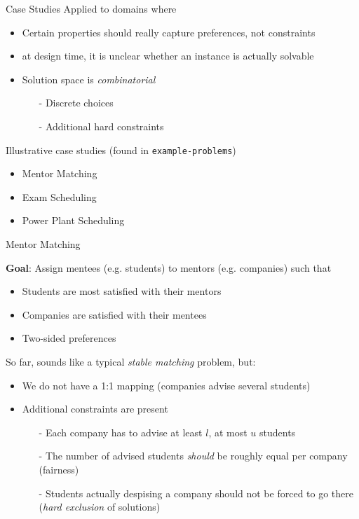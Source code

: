 \documentclass[handout,10pt,xcolor={dvipsnames},fleqn]{beamer}
\begin{document}
\begin{frame}{Case Studies}
Applied to domains where 
\begin{itemize}
\item Certain properties should really capture \alert{preferences}, not constraints
\item at design time, it is \alert{unclear} whether an instance is actually solvable
\item Solution space is \emph{combinatorial}
\begin{itemize}
\item[-] Discrete choices
\item[-] Additional hard constraints
\end{itemize}
\end{itemize}

\vspace*{2ex}

Illustrative case studies (found in \texttt{example-problems})
\begin{itemize}
\item Mentor Matching
\item Exam Scheduling
\item Power Plant Scheduling
\end{itemize}
\end{frame}


\begin{frame}[fragile]{Mentor Matching}

\textbf{Goal}: Assign mentees (e.g. students) to mentors (e.g. companies) such that 
\begin{itemize}
\item Students are most satisfied with their mentors 
\item Companies are satisfied with their mentees
\item Two-sided preferences
\end{itemize}

\vspace*{2ex}

So far, sounds like a typical \emph{stable matching} problem, but:

\begin{itemize}
\item We do not have a 1:1 mapping (companies advise several students)
\item Additional constraints are present
\begin{itemize}
\item[-] Each company has to advise at least $l$, at most $u$ students
\item[-] The number of advised students \emph{should} be roughly equal per company (fairness)
\item[-] Students actually despising a company should not be forced to go there (\emph{hard exclusion} of solutions)
\end{itemize}
\end{itemize}
\end{frame}
\end{document}
